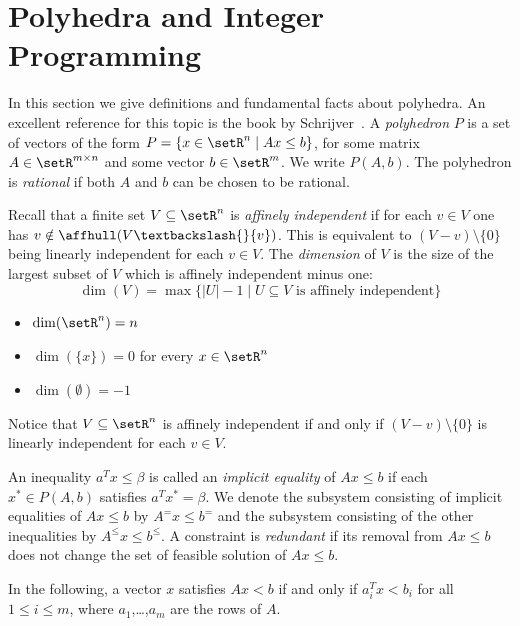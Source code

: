 \chapter{Polyhedra and Integer Programming} 
\label{po:cha:polyhedra}


In this section we give definitions and fundamental facts about
polyhedra. An excellent reference for this topic is the book by
Schrijver~\cite{Schrijver86}.  A \emph{polyhedron} $P$ is a set of
vectors of the form $P=\{ x \in \setR^n \mid Ax \leq b\}$, for some matrix $A \in \setR^{m
  \times n}$ and some vector $b \in \setR^m$. We write $P(A,b)$.  The polyhedron
is \emph{rational} if both $A$ and $b$ can be chosen to be rational.

Recall that a  finite set $V\subseteq\setR^n$ is \emph{affinely independent} if for each $v\in
V$ one has $v\notin\affhull(V \textbackslash{} \{v\})$. This is equivalent to $(V - v) \setminus \{0\}$ being
linearly independent for each $v \in V$. The \emph{dimension} of $V$ is
 the size of the largest subset of $V$ which is affinely independent
 minus one:
\[ \dim(V) = \max\{ |U| - 1 \mid U \subseteq V \text{ is affinely independent} \} \]

\begin{example} 
\begin{itemize}
  \item $\dim(\setR^n) = n$
  \item $\dim(\{x\}) = 0$ for every $x\in\setR^n$
  \item $\dim(\emptyset) = -1$
\end{itemize}
\end{example}
Notice that $V\subseteq\setR^n$ is affinely independent if and only if $(V - v)
\setminus \{0\}$ is linearly independent for each $v \in V$.


\begin{definition}
\label{po:def:5}
An inequality $a^Tx\leq\beta$ is called an \emph{implicit equality} of
$Ax\leq b$ if each $x^* \in P(A,b)$ satisfies $a^Tx^* = \beta$. We denote the
subsystem  consisting of implicit equalities of $Ax\leq b$ by $A^=x\leq b^=$
and the subsystem consisting of the other inequalities by
$A^\leq x\leq b^\leq$. A constraint is \emph{redundant} if its removal from
$Ax\leq b$ does not change the set of feasible solution of $Ax\leq b$.  
\end{definition}

In the following, a vector $x$ satisfies $Ax < b$ if and only if
$a_i^T x < b_i$ for all $1\leq i\leq m$, where $a_1$,\ldots,$a_m$ are the rows of $A$.

